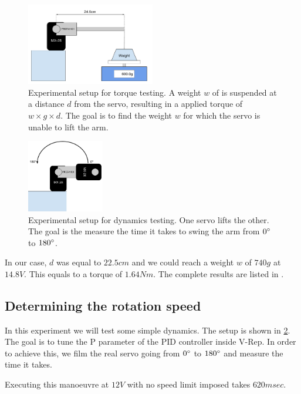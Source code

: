 \begin{figure}[htp]
\center
    \includegraphics[width = 0.5\textwidth]{figures/exp1}
    \caption[Experimental setup for torque testing]{Experimental setup for torque testing. A weight $w$ of is suspended at a distance $d$ from the servo, resulting in a applied torque of $w \times g \times d$. The goal is to find the weight $w$ for which the servo is unable to lift the arm.}
    \label{fig:exp1}
\end{figure}

\begin{figure}[htp]
\center
    \includegraphics[width = 0.3\textwidth]{figures/exp2}
    \caption[Experimental setup dynamics testing]{Experimental setup for dynamics testing. One servo lifts the other. The goal is the measure the time it takes to swing the arm from $0\degree$ to $180\degree$.}
    \label{fig:exp2}
\end{figure}

In our case, $d$ was equal to $22.5cm$ and we could reach a weight $w$ of $740g$ at $14.8V$. This equals to a torque of $1.64Nm$. The complete results are listed in .

\subsection{Determining the rotation speed}
In this experiment we will test some simple dynamics. The setup is shown in \cref{fig:exp2}. The goal is to tune the P parameter of the PID controller inside V-Rep. In order to achieve this, we film the real servo going from $0\degree$ to $180\degree$ and measure the time it takes. 

Executing this manoeuvre at $12V$ with no speed limit imposed takes $620msec$.

